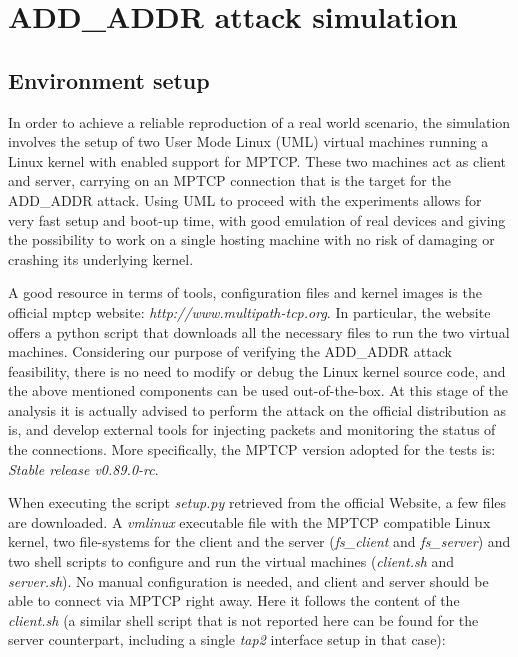 \chapter{ADD\_ADDR attack simulation}
\label{chap:addaddrattackexecution}

\section{Environment setup}
\label{envsetup}
In order to achieve a reliable reproduction of a real world scenario, the simulation involves the setup of two User Mode Linux (UML) virtual machines running a Linux kernel with enabled support for MPTCP. These two machines act as client and server, carrying on an MPTCP connection that is the target for the ADD\_ADDR attack. 
Using UML to proceed with the experiments allows for very fast setup and boot-up time, with good emulation of real devices and giving the possibility to work on a single hosting machine with no risk of damaging or crashing its underlying kernel.

A good resource in terms of tools, configuration files and kernel images is the official mptcp website:
\textit{http://www.multipath-tcp.org}. In particular, the website offers a python script that downloads all the necessary files to run the two virtual machines. Considering our purpose of verifying the ADD\_ADDR attack feasibility, there is no need to modify or debug the Linux kernel source code, and the above mentioned components can be used out-of-the-box. At this stage of the analysis it is actually advised to perform the attack on the official distribution as is, and develop external tools for injecting packets and monitoring the status of the connections. More specifically, the MPTCP version adopted for the tests is: \textit{Stable release v0.89.0-rc}.

When executing the script \textit{setup.py} retrieved from the official Website, a few files are downloaded. A \textit{vmlinux} executable file with the MPTCP compatible Linux kernel, two file-systems for the client and the server (\textit{fs\_client} and \textit{fs\_server}) and two shell scripts to configure and run the virtual machines (\textit{client.sh} and \textit{server.sh}). No manual configuration is needed, and client and server should be able to connect via MPTCP right away.
Here it follows the content of the \textit{client.sh} (a similar shell script that is not reported here can be found for the server counterpart, including a single \textit{tap2} interface setup in that case):


